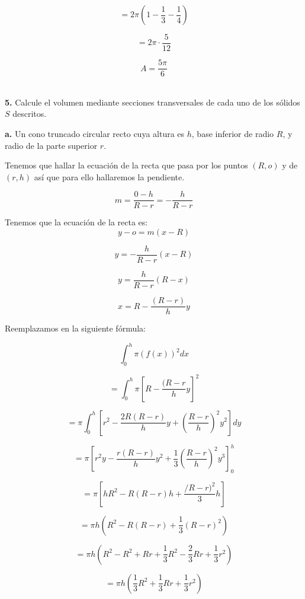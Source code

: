\documentclass[12pt]{article}
\begin{document}
\begin{flushleft}
$$=2\pi \left ( 1-\frac{1}{3}-\frac{1}{4} \right )$$

$$=2\pi \cdot \frac{5}{12}$$

$$A=\frac{5\pi}{6}$$\\
\vspace{0.5cm}

\textbf{5.} Calcule el volumen mediante secciones transversales de cada uno de los sólidos $S$ descritos.\\

\vspace{0.5cm}

\textbf{a.} Un cono truncado circular recto cuya altura es $h$, base inferior de radio $R$, y radio de la parte superior $r$.\\
\vspace{0.5cm}


Tenemos que hallar la ecuación de la recta que pasa por los puntos $(R,o)$ y de $(r,h)$ así que para ello hallaremos la pendiente.

$$m=\frac{0-h}{R-r}=-\frac{h}{R-r}$$

Tenemos que la ecuación de la recta es:\\

$$y-o=m\left(x-R\right)$$

$$y=-\frac{h}{R-r}\left(x-R\right)$$

$$y=\frac{h}{R-r}\left(R-x\right)$$

$$x=R-\frac{\left(R-r\right)}{h}y$$

Reemplazamos en la siguiente fórmula:\\
\vspace{0.5cm}


$$\int_{0}^{h}\pi \left ( f(x) \right )^{2}dx$$

$$=\int_{0}^{h}\pi \left[R-\frac{(R-r}{h}y\right]^{2}$$

$$=\pi\int_{0}^{h}\left[r^{2}-\frac{2R(R-r)}{h}y+\left(\frac{R-r}{h}\right)^{2}y^{2}\right]dy$$

$$=\pi\left[r^{2}y-\frac{r(R-r)}{h}y^{2}+\frac{1}{3}\left(\frac{R-r}{h}\right)^{2}y^{3}\right]_{0}^{h}$$

$$=\pi\left[hR^{2}-R(R-r)h+\frac{/R-r)^{2}}{3}h\right]$$

$$=\pi h\left(R^{2}-R(R-r)+\frac{1}{3}(R-r)^{2}\right)$$


$$=\pi h\left(R^{2}-R^{2}+Rr+\frac{1}{3}R^{2}-\frac{2}{3}Rr+\frac{1}{3}r^{2}\right)$$

$$=\pi h \left(\frac{1}{3}R^{2}+\frac{1}{3}Rr+\frac{1}{3}r^{2}\right)$$


\end{flushleft}
\end{document}
